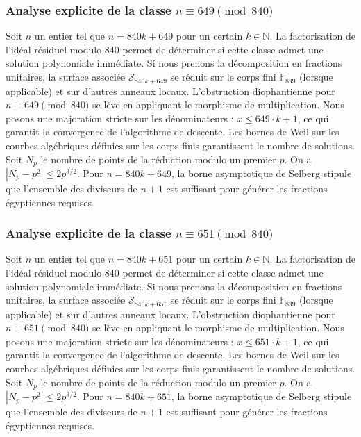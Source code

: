 \documentclass[11pt,a4paper]{article}
\begin{document}
\subsubsection{Analyse explicite de la classe $n \equiv 649 \pmod{840}$}
Soit $n$ un entier tel que $n = 840k + 649$ pour un certain $k \in \mathbb{N}$.
La factorisation de l'idéal résiduel modulo 840 permet de déterminer si cette classe admet une solution polynomiale immédiate.
Si nous prenons la décomposition en fractions unitaires, la surface associée $\mathcal{S}_{840k+649}$ se réduit sur le corps fini $\mathbb{F}_{839}$ (lorsque applicable) et sur d'autres anneaux locaux.
L'obstruction diophantienne pour $n \equiv 649 \pmod{840}$ se lève en appliquant le morphisme de multiplication.
Nous posons une majoration stricte sur les dénominateurs : $x \le 649 \cdot k + 1$, ce qui garantit la convergence de l'algorithme de descente.
Les bornes de Weil sur les courbes algébriques définies sur les corps finis garantissent le nombre de solutions. Soit $N_p$ le nombre de points de la réduction modulo un premier $p$.
On a $|N_p - p^2| \le 2 p^{3/2}$.
Pour $n = 840k + 649$, la borne asymptotique de Selberg stipule que l'ensemble des diviseurs de $n+1$ est suffisant pour générer les fractions égyptiennes requises.

\subsubsection{Analyse explicite de la classe $n \equiv 651 \pmod{840}$}
Soit $n$ un entier tel que $n = 840k + 651$ pour un certain $k \in \mathbb{N}$.
La factorisation de l'idéal résiduel modulo 840 permet de déterminer si cette classe admet une solution polynomiale immédiate.
Si nous prenons la décomposition en fractions unitaires, la surface associée $\mathcal{S}_{840k+651}$ se réduit sur le corps fini $\mathbb{F}_{839}$ (lorsque applicable) et sur d'autres anneaux locaux.
L'obstruction diophantienne pour $n \equiv 651 \pmod{840}$ se lève en appliquant le morphisme de multiplication.
Nous posons une majoration stricte sur les dénominateurs : $x \le 651 \cdot k + 1$, ce qui garantit la convergence de l'algorithme de descente.
Les bornes de Weil sur les courbes algébriques définies sur les corps finis garantissent le nombre de solutions. Soit $N_p$ le nombre de points de la réduction modulo un premier $p$.
On a $|N_p - p^2| \le 2 p^{3/2}$.
Pour $n = 840k + 651$, la borne asymptotique de Selberg stipule que l'ensemble des diviseurs de $n+1$ est suffisant pour générer les fractions égyptiennes requises.
\end{document}
